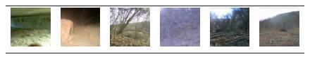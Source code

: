 \begin{figure}[htp!]
\begin{tabularx}{\textwidth}{Y Y Y !{\space} Y Y Y !{\space}}
        \includegraphics{gfx/unconditional-diffusion-sampling-caltech-qual/rgb_5860ef9d-23d2-11e8-a6a3-ec086b02610b.jpg} & \includegraphics{gfx/unconditional-diffusion-sampling-caltech-qual/diffusion_00006.png} & \includegraphics{gfx/unconditional-diffusion-sampling-caltech-qual/rgb_58629181-23d2-11e8-a6a3-ec086b02610b.jpg} & \includegraphics{gfx/unconditional-diffusion-sampling-caltech-qual/diffusion_00007.png} & \includegraphics{gfx/unconditional-diffusion-sampling-caltech-qual/rgb_58629415-23d2-11e8-a6a3-ec086b02610b.jpg} & \includegraphics{gfx/unconditional-diffusion-sampling-caltech-qual/diffusion_00008.png}
    \end{tabularx}
    \caption{
    }
    \label{fig:qualitative-evaluation-unconditional-sampling-caltech}
\end{figure}

